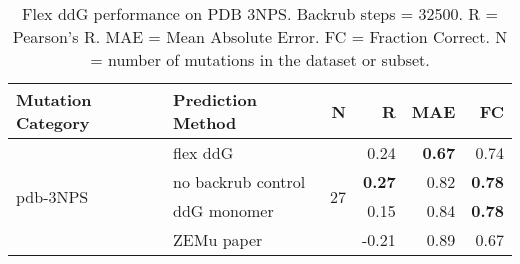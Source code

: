 \begin{table}
  \begin{tabular}{llrrrr}
\toprule
Mutation Category &   Prediction Method &   N &     R &  MAE &   FC \\
\midrule
 \multirow{ 4}{*}{pdb-3NPS} & flex ddG & \multirow{ 4}{*}{27} & 0.24 & \textbf{0.67} & 0.74  \\
 & no backrub control & & \textbf{0.27} & 0.82 & \textbf{0.78}  \\
 & ddG monomer & & 0.15 & 0.84 & \textbf{0.78}  \\
 & ZEMu paper & & -0.21 & 0.89 & 0.67  \\
\bottomrule
\end{tabular}
  \caption[Flex ddG performance on PDB 3NPS]{
    Flex ddG performance on PDB 3NPS. Backrub steps = 32500. R = Pearson's R. MAE = Mean Absolute Error. FC = Fraction Correct. N = number of mutations in the dataset or subset.
  } \label{tab:table-pdb-3NPS}
\end{table}
